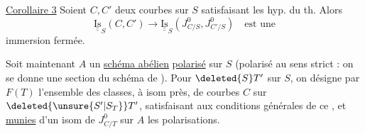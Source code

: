 

  \uline{Corollaire 3} Soient $C,C'$ deux courbes sur $S$ satisfaisant les hyp. du th. Alors
\[
\underline{\underline{\mathrm{Is}}}_S(C,C')\longrightarrow\underline{\underline{\mathrm{Is}}}_S(J^0_{C/S},J^0_{C'/S})\quad\text{est une}
\]
immersion fermée.

Soit maintenant $A$ un \uline{schéma abélien} \uline{polarisé} sur $S$  (polarisé au sens strict : on se donne une section du schéma de ). Pour  $\deleted{S}T'$ sur $S$, on désigne par $F(T)$ l'ensemble des classes, à isom près, de courbes $C$ sur $\deleted{\unsure{S'|S_T}}T'$, satisfaisant aux conditions générales de ce , et \uline{munies} d'un isom de $J^0_{C/T}$ sur $A$   les polarisations.


